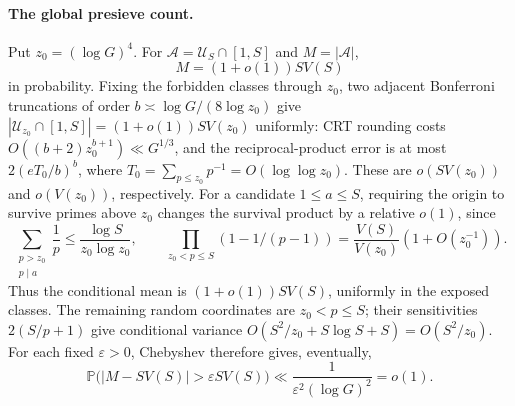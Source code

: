 \documentclass[11pt,a4paper]{article}
\newcommand{\Prob}{\mathbb P}
\begin{document}
\paragraph{The global presieve count.}
Put $z_0=(\log G)^4$.
For $\mathcal A=\mathcal U_S\cap[1,S]$ and $M=|\mathcal A|$,
\[
                       M=(1+o(1))SV(S)
\]
in probability. Fixing the forbidden classes through $z_0$, two
adjacent Bonferroni truncations of order
$b\asymp\log G/(8\log z_0)$ give $|\mathcal U_{z_0}\cap[1,S]|=(1+o(1))SV(z_0)$ uniformly:
CRT rounding costs $O((b+2)z_0^{b+1})\ll G^{1/3}$, and the
reciprocal-product error is at most $2(eT_0/b)^b$, where
$T_0=\sum_{p\le z_0}p^{-1}=O(\log\log z_0)$.
These are $o(SV(z_0))$ and $o(V(z_0))$, respectively.
For a candidate $1\le a\le S$, requiring the origin to survive primes
above $z_0$ changes the survival product by a relative $o(1)$, since
\[
 \sum_{\substack{p>z_0\\p\mid a}}\frac1p
 \le\frac{\log S}{z_0\log z_0},\qquad
 \prod_{z_0<p\le S}(1-1/(p-1))
 =\frac{V(S)}{V(z_0)}(1+O(z_0^{-1})).
\]
Thus the conditional mean is $(1+o(1))SV(S)$, uniformly in the
exposed classes. The remaining random coordinates are $z_0<p\le S$;
their sensitivities $2(S/p+1)$ give conditional
variance $O(S^2/z_0+S\log S+S)=O(S^2/z_0)$.
For each fixed $\varepsilon>0$, Chebyshev therefore gives, eventually,
\[
 \Prob\bigl(|M-SV(S)|>\varepsilon SV(S)\bigr)
       \ll \frac{1}{\varepsilon^2(\log G)^2}=o(1).
\]
\end{document}
